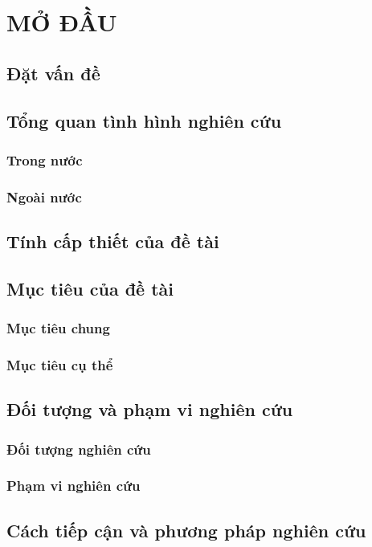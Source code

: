 \chapter{MỞ ĐẦU}
\section{Đặt vấn đề}
\section{Tổng quan tình hình nghiên cứu}
\subsection{Trong nước}
\subsection{Ngoài nước}
\section{Tính cấp thiết của đề tài}
\section{Mục tiêu của đề tài}
\subsection{Mục tiêu chung}
\subsection{Mục tiêu cụ thể}
\section{Đối tượng và phạm vi nghiên cứu}
\subsection{Đối tượng nghiên cứu}
\subsection{Phạm vi nghiên cứu}
\section{Cách tiếp cận và phương pháp nghiên cứu}